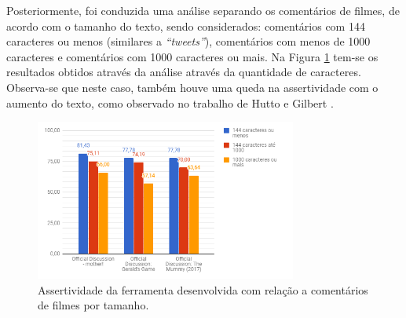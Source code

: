 Posteriormente, foi conduzida uma análise separando
os comentários de filmes, de acordo com o tamanho do texto, sendo considerados:
comentários com 144 caracteres ou menos (similares a \textit{``tweets''}), comentários com menos de 1000 caracteres e comentários com
1000 caracteres ou mais. Na Figura \ref{fig:fil2} tem-se os resultados obtidos através da
análise através da quantidade de caracteres. Observa-se que neste caso, também
houve uma queda na assertividade com o aumento do texto, como observado no
trabalho de Hutto e Gilbert \cite{conf/icwsm/HuttoG14}. 

\begin{figure}[!htbp]
\centering
\includegraphics[height=200px]{imagens/filmes2.png}
\caption{Assertividade da ferramenta desenvolvida com relação a comentários de
filmes por tamanho.}
\label{fig:fil2}
\end{figure}
